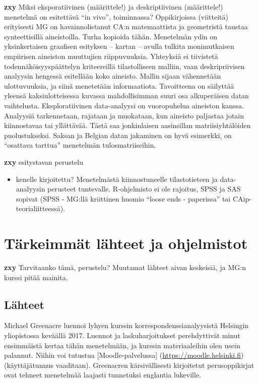 \documentclass[
  finnish,
]{book}
\providecommand{\tightlist}{%
  \setlength{\itemsep}{0pt}\setlength{\parskip}{0pt}}
\begin{document}
\textbf{zxy} Miksi eksporatiivinen (määrittele!) ja deskriptiivinen (määrittele!)
menetelmä on esitettävä ``in vivo'', toiminnassa? Oppikirjoissa (viitteitä)
erityisesti MG on havainnolistanut CA:n matemaattista ja geometristä taustaa
synteettisillä aineistoilla. Turha kopioida tähän. Menetelmän ydin on
yksinkertaisen graafisen esityksen -- kartan -- avulla tulkita monimutkaisen
empiirisen aineiston muuttujien riippuvuuksia. Yhteyksiä ei tiivistetä
todennäköisyyspäättelyn kriteereillä tilastolliseen malliin, vaan deskripriivisen
analyysin hengessä esitellään koko aineisto. Mallin sijaan vähennetään ulottuvuuksia,
ja siinä menetetään informaatiota. Tavoitteena on säilyttää yleensä kaksiulotteisessa
kuvassa mahdollisimman suuri osa alkuperäisen datan vaihtelusta. Eksploratiivinen
data-analyysi on vuoropuhelua aineiston kanssa. Analyysiä tarkennetaan, rajataan
ja muokataan, kun aineisto paljastaa jotain kiinnostavaa tai yllättävää. Tästä
saa jonkinlaisen aasinsillan matriisiyhtälöiden puolustukseksi.
Saksan ja Belgian datan jakaminen on hyvä esimerkki, on ``osattava tarttua''
menetelmän tulosmatriiseihin.

\textbf{zxy} esitystavan perustelu

\begin{itemize}
\tightlist
\item
  kenelle kirjoitettu? Menetelmästä kiinnostuneelle tilastotieteen ja data-analyysin
  perusteet tuntevalle. R-ohjelmisto ei ole rajoitus, SPSS ja SAS sopivat
  (SPSS - MG:llä kriittinen huomio ``loose ends - paperissa'' tai CAip-teorialiitteessä).
\end{itemize}

\hypertarget{tuxe4rkeimmuxe4t-luxe4hteet-ja-ohjelmistot}{%
\section{Tärkeimmät lähteet ja ohjelmistot}\label{tuxe4rkeimmuxe4t-luxe4hteet-ja-ohjelmistot}}

\textbf{zxy} Tarvitaanko tämä, perustelu? Muutamat lähteet aivan keskeisiä, ja MG:n
kurssi pitää mainita.

\hypertarget{luxe4hteet}{%
\subsection{Lähteet}\label{luxe4hteet}}

Michael Greenacre luennoi lyhyen kurssin korrespondenssianalyysistä Helsingin
yliopistossa keväällä 2017\citep{RefWorks:doc:5b6ef091e4b0984fd9b8c0ca}. Luennot ja
laskuharjoitukset perehdyttivät minut ensimmäistä kertaa tähän menetelmään, ja
kurssin materiaaleihin olen usein palannut. Niihin voi tutustua
{[}Moodle-palvelussa{]} (\url{https://moodle.helsinki.fi}) (käyttäjätunnus vaaditaan).
Greenacren kärsivällisesti kirjoitetut perusoppikirjat ovat tehneet menetelmää
laajasti tunnetuksi englantia lukeville.
\end{document}

